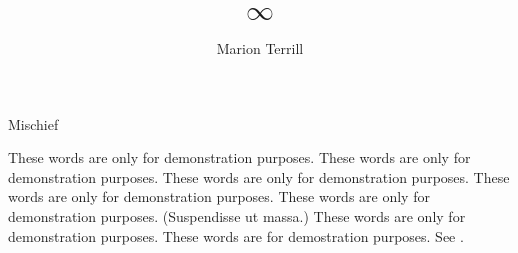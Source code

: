 \documentclass{grattan}
\title{\(\infty\)}
\author{Marion Terrill}
\begin{document}
\lipsum[1-5]

\begin{table}
\caption{Mischief}\label{tbl:example}
\vspace{11\baselineskip}
\end{table}

\lipsum[1-6]

These words are only for demonstration purposes. These words are only for demonstration purposes. These words are only for demonstration purposes. These words are only for demonstration purposes. These words are only for demonstration purposes.  (Suspendisse ut massa.) %
These words are only for demonstration purposes. %
These words are for demostration purposes. See .%

\lipsum[1-5]

\lipsum


\nocite{ABS2009Researchexperimentaldevelopmenta}
\printbibliography
\end{document}
